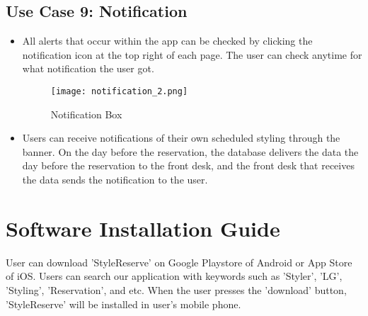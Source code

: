 \documentclass[conference]{IEEEtran}
\begin{document}
\subsection{Use Case 9: Notification}
\begin{itemize}
    \begin{figure}[htbp]
    \centerline{\texttt{[image: notification\_1.png]}}
    \label{fig}
    \caption{Notification Button}
    \end{figure}
    \item All alerts that occur within the app can be checked by clicking the notification icon at the top right of each page. The user can check anytime for what notification the user got.\\
    
    \begin{figure}[htbp]
    \centerline{\texttt{[image: notification\_2.png]}}
    \label{fig}
    \caption{Notification Box}
    \end{figure}
    \item Users can receive notifications of their own scheduled styling through the banner. On the day before the reservation, the database delivers the data the day before the reservation to the front desk, and the front desk that receives the data sends the notification to the user.\\
\end{itemize}

\section{Software Installation Guide}
User can download ’StyleReserve’ on Google Playstore of Android or App Store of iOS. Users can search our application with keywords such as 'Styler', 'LG', 'Styling', 'Reservation', and
etc. When the user presses the ’download’ button, ’StyleReserve’
will be installed in user’s mobile phone.\\
\end{document}
